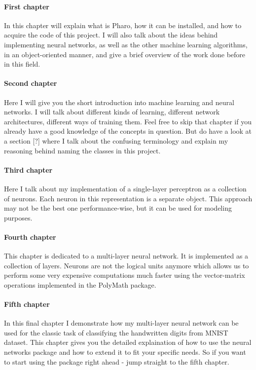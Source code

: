 \paragraph{First chapter} In this chapter will explain what is Pharo, how it can be installed, and how to acquire the code of this project. I will also talk about the ideas behind implementing neural networks, as well as the other machine learning algorithms, in an object-oriented manner, and give a brief overview of the work done before in this field.
\paragraph{Second chapter} Here I will give you the short introduction into machine learning and neural networks. I will talk about different kinds of learning, different network architectures, different ways of training them. Feel free to skip that chapter if you already have a good knowledge of the concepts in question. But do have a look at a section [?] where I talk about the confusing terminology and explain my reasoning behind naming the classes in this project.
\paragraph{Third chapter} Here I talk about my implementation of a single-layer perceptron as a collection of neurons. Each neuron in this representation is a separate object. This approach may not be the best one performance-wise, but it can be used for modeling purposes.
\paragraph{Fourth chapter} This chapter is dedicated to a multi-layer neural network. It is implemented as a collection of layers. Neurons are not the logical units anymore which allows us to perform some very expensive computations much faster using the vector-matrix operations implemented in the PolyMath package.
\paragraph{Fifth chapter} In this final chapter I demonstrate how my multi-layer neural network can be used for the classic task of classifying the handwritten digits from MNIST dataset. This chapter gives you the detailed explaination of how to use the neural networks package and how to extend it to fit your specific needs. So if you want to start using the package right ahead - jump straight to the fifth chapter.
